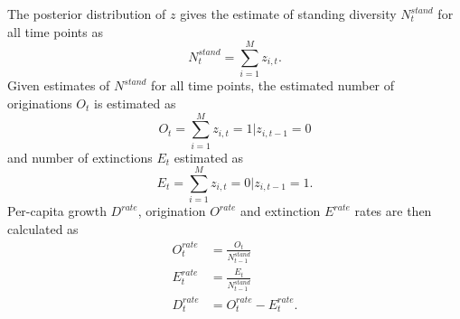 \documentclass[12pt,letterpaper]{article}
\begin{document}
The posterior distribution of \(z\) gives the estimate of standing diversity \(N^{stand}_{t}\) for all time points as 
\begin{equation}
  N^{stand}_{t} = \sum_{i = 1}^{M} z_{i, t}.
  \label{eq:stand_est}
\end{equation}
Given estimates of \(N^{stand}\) for all time points, the estimated number of originations \(O_{t}\) is estimated as 
\begin{equation}
  O_t = \sum_{i = 1}^{M} z_{i, t} = 1 | z_{i, t - 1} = 0
  \label{eq:orig_est}
\end{equation}
and number of extinctions \(E_{t}\) estimated as
\begin{equation}
  E_{t} = \sum_{i = 1}^{M} z_{i, t} = 0 | z_{i, t - 1} = 1.
  \label{eq:death_est}
\end{equation}
Per-capita growth \(D^{rate}\), origination \(O^{rate}\) and extinction \(E^{rate}\) rates are then calculated as
\begin{equation}
  \begin{aligned}
    O^{rate}_{t} &= \frac{O_t}{N^{stand}_{t - 1}} \\
    E^{rate}_{t} &= \frac{E_t}{N^{stand}_{t - 1}} \\
    D^{rate}_{t} &= O^{rate}_{t} - E^{rate}_{t}. \\
  \end{aligned}
  \label{eq:per_capita_est}
\end{equation}

\end{document}
